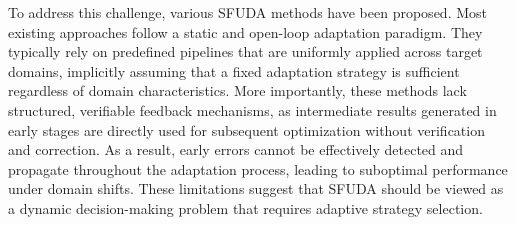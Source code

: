 \documentclass[sigconf, screen]{acmart}
\begin{document}
To address this challenge, various SFUDA methods have been proposed. Most existing approaches follow a static and open-loop adaptation paradigm. They typically rely on predefined pipelines that are uniformly applied across target domains, implicitly assuming that a fixed adaptation strategy is sufficient regardless of domain characteristics. More importantly, these methods lack structured, verifiable feedback mechanisms, as intermediate results generated in early stages are directly used for subsequent optimization without verification and correction. As a result, early errors cannot be effectively detected and propagate throughout the adaptation process, leading to suboptimal performance under domain shifts. These limitations suggest that SFUDA should be viewed as a dynamic decision-making problem that requires adaptive strategy selection.
\end{document}
